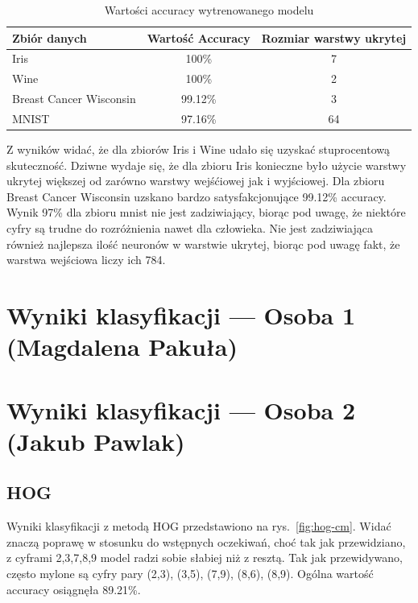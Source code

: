 \documentclass[10pt]{article}
\begin{document}
\begin{table}[H]\centering
    \begin{tabular}{lcc}
        \toprule
        Zbiór danych            & Wartość Accuracy & Rozmiar warstwy ukrytej \\
        \midrule
        Iris                    & 100\%            & 7                       \\
        Wine                    & 100\%            & 2                       \\
        Breast Cancer Wisconsin & 99.12\%          & 3                       \\
        MNIST                   & 97.16\%          & 64                      \\
        \bottomrule
    \end{tabular}
    \caption{Wartości accuracy wytrenowanego modelu}
\end{table}

Z wyników widać, że dla zbiorów Iris i Wine udało się uzyskać stuprocentową skuteczność.
Dziwne wydaje się, że dla zbioru Iris konieczne było użycie warstwy ukrytej większej od zarówno warstwy wejśćiowej jak i wyjściowej.
Dla zbioru Breast Cancer Wisconsin uzskano bardzo satysfakcjonujące 99.12\% accuracy.
Wynik 97\% dla zbioru mnist nie jest zadziwiający, biorąc pod uwagę, że niektóre cyfry są trudne do rozróżnienia nawet dla człowieka.
Nie jest zadziwiająca również najlepsza ilość neuronów w warstwie ukrytej, biorąc pod uwagę fakt, że warstwa wejściowa liczy ich 784.

\pagebreak

\section{Wyniki klasyfikacji --- Osoba 1 (Magdalena Pakuła)}
\pagebreak

\section{Wyniki klasyfikacji --- Osoba 2 (Jakub Pawlak)}

\subsection*{HOG}

Wyniki klasyfikacji z metodą HOG przedstawiono na rys.~\ref{fig:hog-cm}.
Widać znaczą poprawę w stosunku do wstępnych oczekiwań, choć tak jak przewidziano, z cyframi 2,3,7,8,9 model radzi sobie słabiej niż z resztą.
Tak jak przewidywano, często mylone są cyfry pary (2,3), (3,5), (7,9), (8,6), (8,9).
Ogólna wartość accuracy osiągnęła 89.21\%.
\end{document}
